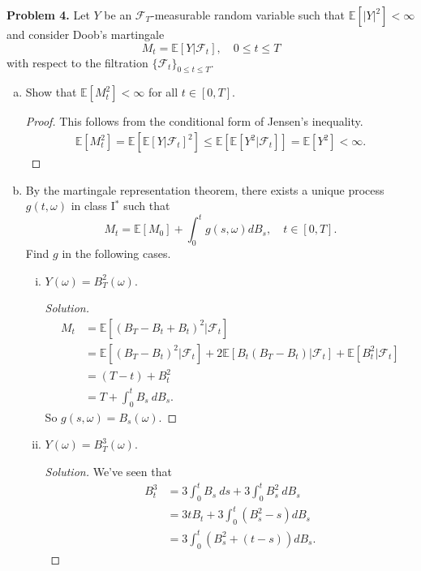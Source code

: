 \documentclass[11pt,letterpaper]{report}
\newcommand{\mcal}[1]{\mathcal{#1}}
\newcommand{\E}{\mathbb{E}}
\newenvironment{solution}
{\begin{proof}[Solution]}
{\end{proof}}
\begin{document}
\noindent\textbf{Problem 4. }
Let $Y$ be an $\mcal{F}_T$-measurable random variable such that $\E[|Y|^2]<\infty$ and consider Doob's martingale
\[
M_t = \E[Y|\mcal{F}_t],\quad 0\leq t\leq T
\]
with respect to the filtration $\{\mcal{F}_t\}_{0\leq t\leq T}$.
\begin{enumerate}[(a)]
	\item Show that $\E[M_t^2]<\infty$ for all $t\in [0, T]$.
	\begin{proof}
		This follows from the conditional form of Jensen's inequality.
		\begin{align*}
			\E[M_t^2]  = \E[\E[Y|\mcal{F}_t]^2] \leq \E[\E[Y^2|\mcal{F}_t]] = \E[Y^2]<\infty.
		\end{align*}
	\end{proof}

	\item By the martingale representation theorem, there exists a unique process $g(t, \omega)$ in class I$^*$ such that
	\[
	M_t = \E[M_0] + \int_0^tg(s, \omega)dB_s,\quad t\in [0,T].
	\]
	Find $g$ in the following cases.
	\begin{enumerate}[(i)]
		\item $Y(\omega) = B^2_T(\omega)$.
		\begin{solution}
			\begin{align*}
				M_t &= \E[(B_T-B_t+B_t)^2|\mcal{F}_t]\\
				&= \E[(B_T-B_t)^2|\mcal{F}_t] + 2\E[B_t(B_T-B_t)|\mcal{F}_t] + \E[B_t^2|\mcal{F}_t]\\
				&= (T-t) + B_t^2\\
				&= T + \int_0^tB_s\ dB_s.
			\end{align*}
			So $g(s, \omega) = B_s(\omega)$.
		\end{solution}

		\item $Y(\omega) = B^3_T(\omega)$.
		\begin{solution}
			We've seen that
			\begin{align*}
			B_t^3 &= 3\int_0^tB_s\ ds + 3\int_0^tB_s^2\ dB_s\\
			&= 3tB_t + 3\int_0^t(B_s^2-s)dB_s\\
			&= 3\int_0^t(B_s^2 + (t-s))dB_s.
			\end{align*}
		\end{solution}
	\end{enumerate}
\end{enumerate}
\end{document}
